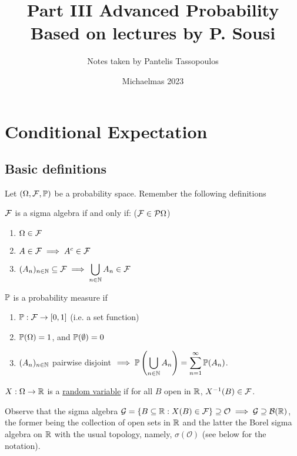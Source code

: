 \documentclass{article}
\title{\Huge Part III Advanced Probability \\ 
\huge Based on lectures by P. Sousi}
\author{\Large Notes taken by Pantelis Tassopoulos}
\date{\Large Michaelmas 2023}
\begin{document}
\maketitle
\newpage

\tableofcontents
\newpage 

\section{Conditional Expectation}
\subsection{Basic definitions}
Let $ (\Omega, \mathcal{F}, \mathbb{P}) $ be a probability space. Remember the following definitions 
\begin{boxdef}\label{def: sigma algebra}
	$ \mathcal{F} $ is a sigma algebra if and only if: ($ \mathcal{F}\in \mathcal{P}{\Omega} $)
	\begin{enumerate}
		\item $ \Omega \in \mathcal{F} $
		\item $ A\in \mathcal{F} \implies A^c\in \mathcal{F}$
		\item $ (A_n)_{n\in \mathbb{N}}\subseteq \mathcal{F} \implies \displaystyle\bigcup_{n\in\mathbb{N}}A_n\in\mathcal{F} $
	\end{enumerate}
\end{boxdef}
\begin{boxdef}\label{def: prob measure}
	$ \mathbb{P} $ is a probability measure if
	\begin{enumerate}
		\item $ \mathbb{P}:\mathcal{F}\to [0,1] $ (i.e. a set function)
		\item $ \mathbb{P}(\Omega) = 1 $, and $ \mathbb{P}(\emptyset) = 0 $
		\item $ (A_n)_{n\in \mathbb{N}} $ pairwise disjoint $ \implies \mathbb{P}\left(\displaystyle\bigcup_{n\in\mathbb{N}}A_n\right) =\displaystyle\sum^{\infty}_{n=1}\mathbb{P}(A_n)$.
	\end{enumerate}
	
\end{boxdef} 
\begin{boxdef}\label{def: rv}
	$ X:\Omega\to \mathbb{R} $ is a \underline{random variable} if for all $ B $ open in $ \mathbb{R} $, $ X^{-1}(B)\in \mathcal{F} $.
\end{boxdef}
\begin{remark}
	Observe that the sigma algebra $ \mathcal{G}=\{B\subseteq\mathbb{R}: X(B)\in\mathcal{F}\}\supseteq \mathcal{O} \implies \mathcal{G}\supseteq \mathcal{B}(\mathbb{R}) $, the former being the collection of open sets in $ \mathbb{R} $ and the latter the Borel sigma algebra on $ \mathbb{R} $ with the usual topology, namely, $ \sigma(\mathcal{O})$ (see below for the notation).
\end{remark}
\end{document}
